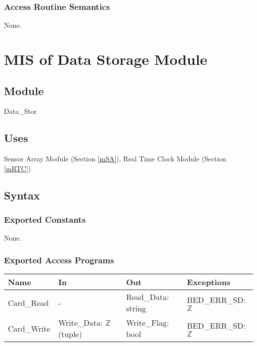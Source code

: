\documentclass[12pt, titlepage]{article}
\begin{document}
\subsubsection{Access Routine Semantics}

None.

\newpage




\section{MIS of Data Storage Module} \label{mDS_1} 

\subsection{Module}

Data\_Stor

\subsection{Uses}

Sensor Array Module (Section \ref{mSA}), Real Time Clock Module (Section \ref{mRTC})    %

\subsection{Syntax}

\subsubsection{Exported Constants}

None.

\subsubsection{Exported Access Programs}

\begin{center}
\begin{tabular}{p{2cm} p{4cm} p{4cm} p{2cm}}
\hline
\textbf{Name} & \textbf{In} & \textbf{Out} & \textbf{Exceptions} \\
\hline
Card\_Read & - & Read\_Data: string & BED\_ERR\_SD: $\mathbb{Z}$ \\
Card\_Write & Write\_Data: $\mathbb{Z}$ (tuple) & Write\_Flag: bool & BED\_ERR\_SD: $\mathbb{Z}$ \\
\hline
\end{tabular}
\end{center}
\end{document}
